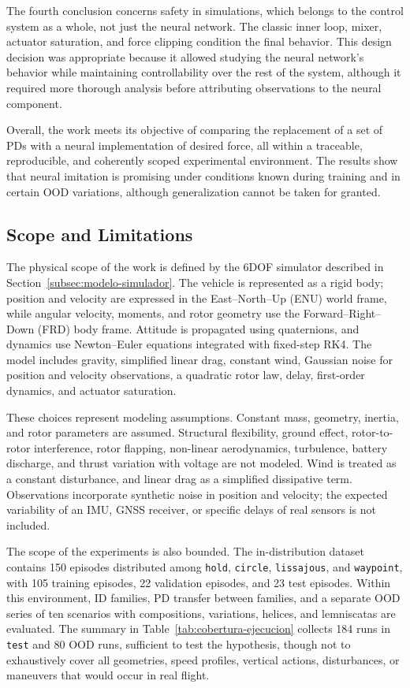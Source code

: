 The fourth conclusion concerns safety in simulations, which belongs to the control system as a whole, not just the neural network. The classic inner loop, mixer, actuator saturation, and force clipping condition the final behavior. This design decision was appropriate because it allowed studying the neural network's behavior while maintaining controllability over the rest of the system, although it required more thorough analysis before attributing observations to the neural component.

Overall, the work meets its objective of comparing the replacement of a set of PDs with a neural implementation of desired force, all within a traceable, reproducible, and coherently scoped experimental environment. The results show that neural imitation is promising under conditions known during training and in certain OOD variations, although generalization cannot be taken for granted.

\subsection{Scope and Limitations}

The physical scope of the work is defined by the 6DOF simulator described in Section~\ref{subsec:modelo-simulador}. The vehicle is represented as a rigid body; position and velocity are expressed in the East--North--Up (ENU) world frame, while angular velocity, moments, and rotor geometry use the Forward--Right--Down (FRD) body frame. Attitude is propagated using quaternions, and dynamics use Newton--Euler equations integrated with fixed-step RK4. The model includes gravity, simplified linear drag, constant wind, Gaussian noise for position and velocity observations, a quadratic rotor law, delay, first-order dynamics, and actuator saturation.

These choices represent modeling assumptions. Constant mass, geometry, inertia, and rotor parameters are assumed. Structural flexibility, ground effect, rotor-to-rotor interference, rotor flapping, non-linear aerodynamics, turbulence, battery discharge, and thrust variation with voltage are not modeled. Wind is treated as a constant disturbance, and linear drag as a simplified dissipative term. Observations incorporate synthetic noise in position and velocity; the expected variability of an IMU, GNSS receiver, or specific delays of real sensors is not included.

The scope of the experiments is also bounded. The in-distribution dataset contains 150 episodes distributed among \texttt{hold}, \texttt{circle}, \texttt{lissajous}, and \texttt{waypoint}, with 105 training episodes, 22 validation episodes, and 23 test episodes. Within this environment, ID families, PD transfer between families, and a separate OOD series of ten scenarios with compositions, variations, helices, and lemniscatas are evaluated. The summary in Table~\ref{tab:cobertura-ejecucion} collects 184 runs in \texttt{test} and 80 OOD runs, sufficient to test the hypothesis, though not to exhaustively cover all geometries, speed profiles, vertical actions, disturbances, or maneuvers that would occur in real flight.

